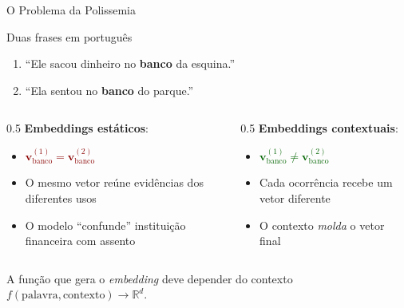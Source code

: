 \documentclass[aspectratio=169, xcolor=dvipsnames]{beamer}
\begin{document}
  \begin{frame}{O Problema da Polissemia}
    \begin{exampleblock}{Duas frases em português}
      \begin{enumerate}
        \item ``Ele sacou dinheiro no \textbf{banco} da esquina.''
        \item ``Ela sentou no \textbf{banco} do parque.''
      \end{enumerate}
    \end{exampleblock}
    \vspace{0.5em}
    \begin{columns}
      \begin{column}{0.5\textwidth}
        \textbf{Embeddings estáticos}:
        \begin{itemize}
          \item \textcolor{DarkRed}{$\mathbf{v}_{\text{banco}}^{(1)} = \mathbf{v}_{\text{banco}}^{(2)}$}
          \item O mesmo vetor reúne evidências dos diferentes usos
          \item O modelo ``confunde'' instituição financeira com assento
        \end{itemize}
      \end{column}
      \begin{column}{0.5\textwidth}
        \textbf{Embeddings contextuais}:
        \begin{itemize}
          \item \textcolor{DarkGreen}{$\mathbf{v}_{\text{banco}}^{(1)} \neq \mathbf{v}_{\text{banco}}^{(2)}$}
          \item Cada ocorrência recebe um vetor diferente
          \item O contexto \textit{molda} o vetor final
        \end{itemize}
      \end{column}
    \end{columns}
    \vspace{0.5em}
    A função que gera o \textit{embedding} deve depender do contexto $f(\text{palavra}, \text{contexto}) \to \mathbb{R}^d$.
  \end{frame}
\end{document}
